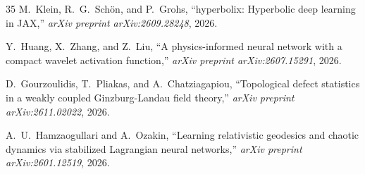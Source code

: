 \documentclass[journal,twoside]{IEEEtran}
\theoremstyle{remark}
\begin{document}
\begin{thebibliography}{35}
M.~Klein, R.~G.~Sch{\"o}n, and P.~Grohs, ``hyperbolix: Hyperbolic deep learning in JAX,'' \emph{arXiv preprint arXiv:2609.28248}, 2026.

Y.~Huang, X.~Zhang, and Z.~Liu, ``A physics-informed neural network with a compact wavelet activation function,'' \emph{arXiv preprint arXiv:2607.15291}, 2026.

D.~Gourzoulidis, T.~Pliakas, and A.~Chatziagapiou, ``Topological defect statistics in a weakly coupled Ginzburg-Landau field theory,'' \emph{arXiv preprint arXiv:2611.02022}, 2026.

A.~U.~Hamzaogullari and A.~Ozakin, ``Learning relativistic geodesics and chaotic dynamics via stabilized Lagrangian neural networks,'' \emph{arXiv preprint arXiv:2601.12519}, 2026.

\end{thebibliography}
\end{document}
